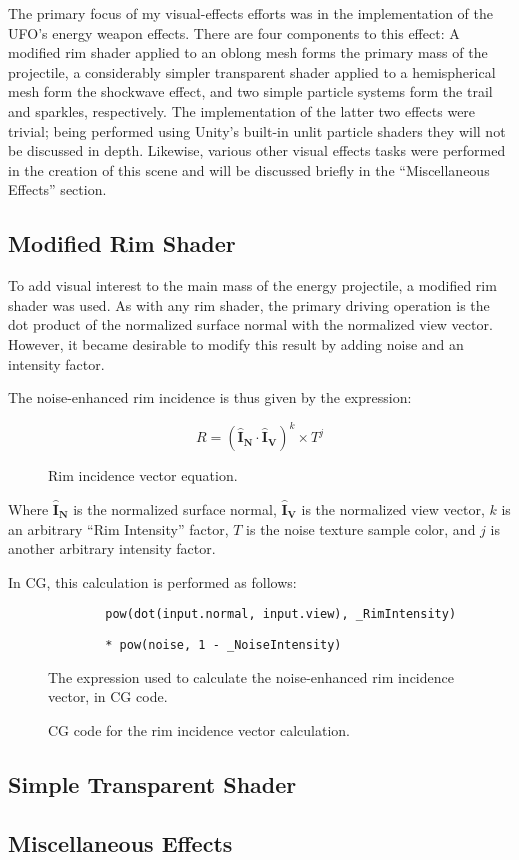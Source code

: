 The primary focus of my visual-effects efforts was in the implementation of the UFO's energy weapon effects.
There are four components to this effect: A modified rim shader applied to an oblong mesh forms the primary mass of the projectile, a considerably simpler transparent shader applied to a hemispherical mesh form the shockwave effect, and two simple particle systems form the trail and sparkles, respectively. The implementation of the latter two effects were trivial; being performed using Unity's built-in unlit particle shaders they will not be discussed in depth. Likewise, various other visual effects tasks were performed in the creation of this scene and will be discussed briefly in the ``Miscellaneous Effects'' section.

\subsection{Modified Rim Shader}
To add visual interest to the main mass of the energy projectile, a modified rim shader was used. As with any rim shader, the primary driving operation is the dot product of the normalized surface normal with the normalized view vector. However, it became desirable to modify this result by adding noise and an intensity factor.

The noise-enhanced rim incidence is thus given by the expression:

\begin{figure}[h]
	\centering
	\[
		R = (\mathbf{\hat{I}_N} \cdot \mathbf{\hat{I}_V})^k \times T^j
	\]
	\caption{Rim incidence vector equation.}
\end{figure}

Where $\mathbf{\hat{I}_N}$ is the normalized surface normal, $\mathbf{\hat{I}_V}$ is the normalized view vector, $k$ is an arbitrary ``Rim Intensity'' factor, $T$ is the noise texture sample color, and $j$ is another arbitrary intensity factor.

In CG, this calculation is performed as follows:

\begin{figure}[h]
	\begin{verbatim}
		pow(dot(input.normal, input.view), _RimIntensity)
	\end{verbatim}
	\begin{verbatim}
		* pow(noise, 1 - _NoiseIntensity)
	\end{verbatim}
	\caption{CG code for the rim incidence vector calculation.}{The expression used to calculate the noise-enhanced rim incidence vector, in CG code.}
\end{figure}



\subsection{Simple Transparent Shader}

\subsection{Miscellaneous Effects}